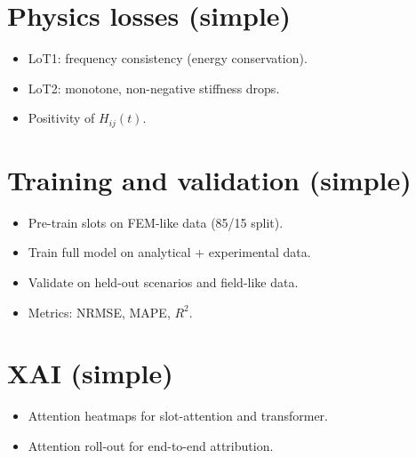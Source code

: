 \documentclass[11pt]{article}
\begin{document}
\section{Physics losses (simple)}
\begin{itemize}
  \item LoT1: frequency consistency (energy conservation).
  \item LoT2: monotone, non-negative stiffness drops.
  \item Positivity of $H_{ij}(t)$.
\end{itemize}

\section{Training and validation (simple)}
\begin{itemize}
  \item Pre-train slots on FEM-like data (85/15 split).
  \item Train full model on analytical + experimental data.
  \item Validate on held-out scenarios and field-like data.
  \item Metrics: NRMSE, MAPE, $R^2$.
\end{itemize}

\section{XAI (simple)}
\begin{itemize}
  \item Attention heatmaps for slot-attention and transformer.
  \item Attention roll-out for end-to-end attribution.
\end{itemize}
\end{document}
